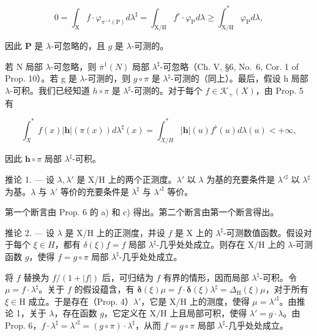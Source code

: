 \[
0 = \int_ {\mathrm{X}} f \cdot \varphi_ {\pi^ {- 1} (\mathrm{P})} d \lambda^ {\sharp} = \int_ {\mathrm{X/H}} f ^ {\flat} \cdot \varphi_ {\mathrm{P}} d \lambda \geqslant \int_ {\mathrm{X/H}} ^ {*} \varphi_ {\mathrm{P}} d \lambda ,
\]

因此 \(\mathbf{P}\) 是 \(\lambda\)-可忽略的，且 \(g\) 是 \(\lambda\)-可测的。

若 N 局部 \(\lambda\)-可忽略，则 \(\overline{\pi}^{1}(N)\) 局部 \(\lambda^{\sharp}\)-可忽略（Ch. V, §6, No.~6, Cor. 1 of Prop. 10）。若 g 是 \(\lambda\)-可测的，则 \(g \circ \pi\) 是 \(\lambda^{\sharp}\)-可测的（同上）。最后，假设 h 局部 \(\lambda\)-可积。我们已经知道 \(h \circ \pi\) 是 \(\lambda^{\sharp}\)-可测的。对于每个 \(f \in \mathcal{K}_{+}(X)\)，由 Prop. 5 有

\[
\int_ {X} ^ {*} f (x) | \mathbf {h} | (\pi (x)) d \lambda^ {\sharp} (x) = \int_ {X / H} ^ {*} | \mathbf {h} | (u) f ^ {\flat} (u) d \lambda (u) <   + \infty ,
\]

因此 \(\mathbf{h} \circ \pi\) 局部 \(\lambda^{\sharp}\)-可积。

推论 1. --- 设 \(\lambda, \lambda'\) 是 X/H 上的两个正测度。\(\lambda'\) 以 \(\lambda\) 为基的充要条件是 \(\lambda'^{\sharp}\) 以 \(\lambda^{\sharp}\) 为基。\(\lambda\) 与 \(\lambda'\) 等价的充要条件是 \(\lambda^{\sharp}\) 与 \(\lambda'^{\sharp}\) 等价。

第一个断言由 Prop. 6 的 a) 和 c) 得出。第二个断言由第一个断言得出。

推论 2. --- 设 \(\lambda\) 是 X/H 上的正测度，并设 \(f\) 是 X 上的 \(\lambda^{\sharp}\)-可测数值函数。假设对于每个 \(\xi \in H\)，都有 \(\delta(\xi)f = f\) 局部 \(\lambda^{\sharp}\)-几乎处处成立。则存在 X/H 上的 \(\lambda\)-可测函数 \(g\)，使得 \(f = g \circ \pi\) 局部 \(\lambda^{\sharp}\)-几乎处处成立。

将 \(f\) 替换为 \(f / (1 + |f|)\) 后，可归结为 \(f\) 有界的情形，因而局部 \(\lambda^{\sharp}\)-可积。令 \(\mu = f \cdot \lambda^{\sharp}\)。关于 \(f\) 的假设蕴含，有 \(\pmb{\delta}(\xi) \mu = f \cdot \pmb{\delta}(\xi) \lambda^{\sharp} = \Delta_{\mathrm{H}}(\xi) \mu\)，对于所有 \(\xi \in \mathrm{H}\) 成立。于是存在（Prop. 4）\(\lambda'\)，它是 \(\mathrm{X} / \mathrm{H}\) 上的测度，使得 \(\mu = \lambda'^{\sharp}\)。由推论 1，关于 \(\lambda\)，存在函数 \(g\)，它定义在 \(\mathrm{X} / \mathrm{H}\) 上且局部可积，使得 \(\lambda' = g \cdot \lambda\)。由 Prop. 6，\(f \cdot \lambda^{\sharp} = \lambda'^{\sharp} = (g \circ \pi) \cdot \lambda^{\sharp}\)，从而 \(f = g \circ \pi\) 局部 \(\lambda^{\sharp}\)-几乎处处成立。

